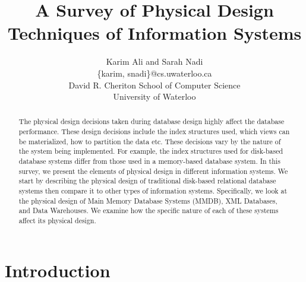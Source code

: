 \documentclass[12pt,a4paper]{article}
\begin{document}
\title{A Survey of Physical Design Techniques of Information Systems}


\author{Karim Ali and Sarah Nadi\\
\{karim, snadi\}@cs.uwaterloo.ca \\
David R. Cheriton School of Computer Science\\
University of Waterloo\\
}

\date{}
\maketitle



\begin{abstract}
The physical design decisions taken during database design highly affect the database performance. These design decisions include the index structures used,
which views can be materialized, how to partition the data etc. These decisions vary by the nature of the system being implemented. For example, the index
structures used for disk-based database systems differ from those used in a memory-based database system. In this survey, we present the elements of
physical design in different information systems. We start by describing the physical design of traditional disk-based relational database systems then compare
it to other types of information systems. Specifically, we look at the physical design of Main Memory Database Systems (MMDB), XML Databases, and Data
Warehouses. We examine how the specific nature of each of these systems affect its physical design. 
\end{abstract}

\section{Introduction}
\end{document}
